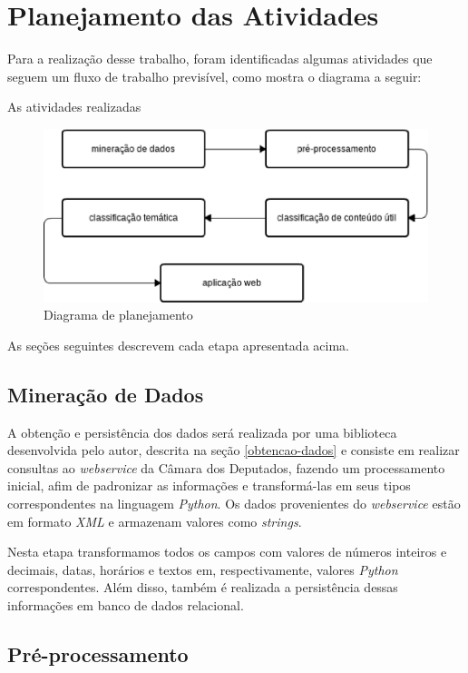 \section{Planejamento das Atividades}

Para a realização desse trabalho, foram identificadas algumas atividades que seguem um fluxo de trabalho previsível, como mostra o diagrama a seguir:

As atividades realizadas

\begin{figure}[h]
    \centering
    \includegraphics[scale=0.5]{figuras/planejamento.eps}
    \caption{Diagrama de planejamento}
\end{figure}

As seções seguintes descrevem cada etapa apresentada acima.

\subsection{Mineração de Dados}

A obtenção e persistência dos dados será realizada por uma biblioteca desenvolvida pelo autor, descrita na seção \ref{obtencao-dados} e consiste em realizar consultas ao \textit{webservice} da Câmara dos Deputados, fazendo um processamento inicial, afim de padronizar as informações e transformá-las em seus tipos correspondentes na linguagem \textit{Python}. Os dados provenientes do \textit{webservice} estão em formato \textit{XML} e armazenam valores como \textit{strings}.

Nesta etapa transformamos todos os campos com valores de números inteiros e decimais, datas, horários e textos em, respectivamente, valores \textit{Python} correspondentes. Além disso, também é realizada a persistência dessas informações em banco de dados relacional.

\subsection{Pré-processamento}

